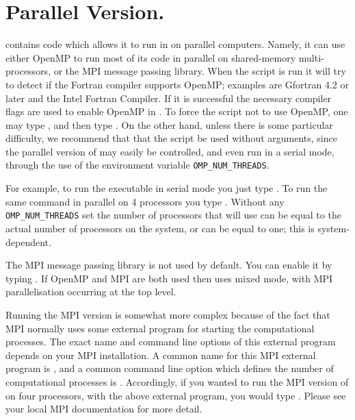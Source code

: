 \documentclass[12pt]{report}
\begin{document}
\section{ Parallel Version.} \label{sec:Parallel}
\AUTO contains code which allows
it to run in on parallel computers.  Namely,
it can use either OpenMP to run most of its code in parallel
on shared-memory multi-processors, or the MPI message passing
library.
When the  script is run it will try to
detect if the Fortran compiler supports OpenMP; examples
are Gfortran 4.2 or later and the Intel Fortran Compiler.
If it is successful the necessary compiler flags are used
to enable OpenMP in \AUTO.
To force the  script not to use OpenMP,
one may type ,
and then type .
On the other hand, unless there is some
particular difficulty, we recommend that that the 
 script be used without arguments, since the
parallel version of \AUTO may easily be controlled,
and even run in a serial mode,  
through the use of the environment variable {\tt OMP\_NUM\_THREADS}.

For example, to run the \AUTO executable 
in serial mode you just type .
To run the same command in parallel on 4 processors you type 
. Without any {\tt OMP\_NUM\_THREADS}
set the number of processors that \AUTO will use can be equal to the
actual number of processors on the system, or can be equal to one;
this is system-dependent.

The MPI message passing library is not used by default. You can enable it
by typing  . If OpenMP and MPI are
both used then \AUTO uses mixed mode, with MPI parallelisation
occurring at the top level.

Running the MPI version is somewhat more complex because of the fact
that MPI normally uses some external program for starting the
computational processes.  The exact name and command line options of
this external program depends on your MPI installation.  A common name
for this MPI external program is , and a common command
line option which defines the number of computational processes is .  Accordingly, if you wanted to run the MPI version of \AUTO
on four processors, with the above external program, you would
type .  Please see your local MPI
documentation for more detail.

\end{document}
